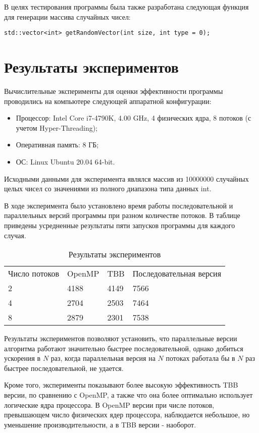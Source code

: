 \documentclass{report}
\begin{document}
\par В целях тестирования программы была также разработана следующая функция для генерации массива случайных чисел:
\begin{lstlisting}
std::vector<int> getRandomVector(int size, int type = 0);
\end{lstlisting}

\newpage

\section*{Результаты экспериментов}
Вычислительные эксперименты для оценки эффективности программы проводились на компьютере следующей аппаратной конфигурации:

\begin{itemize}
\item Процессор: Intel Core i7-4790K, 4.00 GHz, 4 физических ядра, 8 потоков (с учетом Hyper-Threading);
\item Оперативная память: 8 ГБ;
\item ОС: Linux Ubuntu 20.04 64-bit.
\end{itemize}

\par Исходными данными для эксперимента являлся массив из 10000000 случайных целых чисел со значениями из полного диапазона типа данных int.
\par В ходе эксперимента было установлено время работы последовательной и параллельных версий программы при разном количестве потоков. В таблице приведены усредненные результаты пяти запусков программы для каждого случая.

\begin{table}[!h]
\caption{Результаты экспериментов}
\centering
\begin{tabular}{llll}
Число потоков & OpenMP & TBB & Последовательная версия \\
2 & 4188 & 4149 & 7566 \\
4 & 2704 & 2503 & 7464 \\
8 & 2879 & 2301 & 7538 \\
\end{tabular}
\end{table}

\par Результаты экспериментов позволяют установить, что параллельные версии алгоритма работают значительно быстрее последовательной, однако добиться ускорения в $N$ раз, когда параллельная версия на $N$ потоках работала бы в $N$ раз быстрее последовательной, не удается.
\par Кроме того, эксперименты показывают более высокую эффективность TBB версии, по сравнению с OpenMP, а также что она более оптимально использует логические ядра процессора. В OpenMP версии при числе потоков, превышающем число физических ядер процессора, наблюдается небольшое, но уменьшение производительности, а в TBB версии - наоборот.
\end{document}
